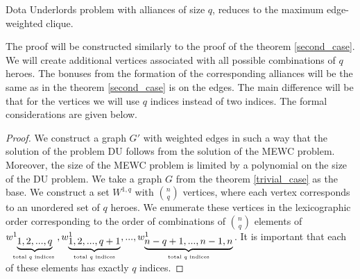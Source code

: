 \documentclass[smallextended]{svjour3}       %
\begin{document}
\begin{theorem}
\label{general_case}
    Dota Underlords problem with alliances of size $q$, reduces to the maximum edge-weighted clique.
\end{theorem}
	The proof will be constructed similarly to the proof of the theorem \ref {second_case}.
We will create additional vertices associated with all possible combinations of $q$ heroes. The bonuses from the formation of the corresponding alliances will be the same as in the theorem \ref {second_case} is on the edges.
The main difference will be that for the vertices we will use $q$ indices instead of two indices. The formal considerations are given below.
\begin{proof}
    
We construct a graph $G'$ with weighted edges in such a way that the solution of the problem DU follows from the solution of the MEWC problem. Moreover, the size of the MEWC problem is limited by a polynomial on the size of the DU problem.
    We take a graph $G$ from the theorem \ref{trivial_case} as the base. We construct a set $W^{1,q} $ with $\binom{n}{q} $ vertices, where each vertex corresponds to an unordered set of $q$ heroes. We enumerate these vertices in the lexicographic order corresponding to the order of  combinations of $ \binom {n}{q} $ elements of $ w^1_ {\underbrace {1,2, ..., q}_\text{total $ q $ indices }}, w^1_{\underbrace {1,2, ..., q + 1}_\text {total $ q $ indices}}, ..., w^1_ {\underbrace{n-q+1, ..., n-1, n}_\text{total $ q $ indices}} $. It is important that each of these elements has exactly $q$ indices.


\end{proof}
\end{document}
